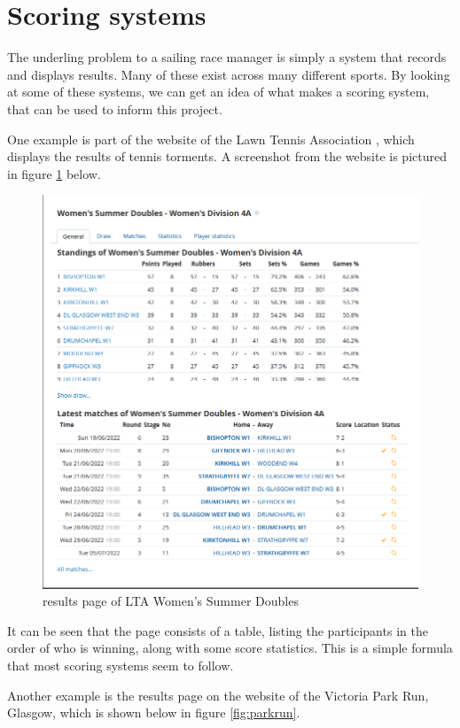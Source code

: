 \documentclass{l4proj}
\begin{document}
\section{Scoring systems}
The underling problem to a sailing race manager is simply a system that records and displays results. Many of these exist across many different sports. By looking at some of these systems, we can get an idea of what makes a scoring system, that can be used to inform this project.

One example is part of the website of the Lawn Tennis Association \citep{Tennis}, which displays the results of tennis torments. A screenshot from the website is pictured in figure \ref{fig:Tennis} below.

\begin{figure}[H]
    \centering
    \includegraphics[width=0.6\linewidth]{images/Tennis systme.png} 

    \caption{results page of LTA Women's Summer Doubles \citep{Tennis}
    }

    \label{fig:Tennis} 
\end{figure}

It can be seen that the page consists of a table, listing the participants in the order of who is winning, along with some score statistics. This is a simple formula that most scoring systems seem to follow.

Another example is the results page on the website of the Victoria Park Run, Glasgow, which is shown below in figure \ref{fig:parkrun}.
\end{document}
